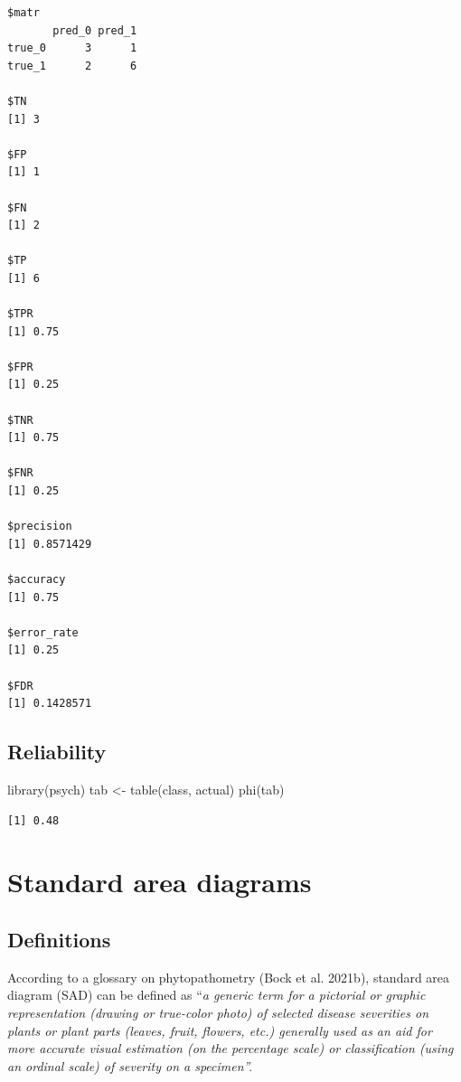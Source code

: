 \documentclass[
  letterpaper,
]{book}
\newenvironment{Shaded}{\begin{snugshade}}{\end{snugshade}}
\newcommand{\FunctionTok}[1]{\textcolor[rgb]{0.28,0.35,0.67}{#1}}
\newcommand{\NormalTok}[1]{\textcolor[rgb]{0.00,0.23,0.31}{#1}}
\newcommand{\OtherTok}[1]{\textcolor[rgb]{0.00,0.23,0.31}{#1}}
\begin{document}
\begin{verbatim}
$matr
       pred_0 pred_1
true_0      3      1
true_1      2      6

$TN
[1] 3

$FP
[1] 1

$FN
[1] 2

$TP
[1] 6

$TPR
[1] 0.75

$FPR
[1] 0.25

$TNR
[1] 0.75

$FNR
[1] 0.25

$precision
[1] 0.8571429

$accuracy
[1] 0.75

$error_rate
[1] 0.25

$FDR
[1] 0.1428571
\end{verbatim}

\hypertarget{reliability}{%
\section{Reliability}\label{reliability}}

\begin{Shaded}
\begin{Highlighting}[]
\FunctionTok{library}\NormalTok{(psych)}
\NormalTok{tab }\OtherTok{\textless{}{-}} \FunctionTok{table}\NormalTok{(class, actual)}
\FunctionTok{phi}\NormalTok{(tab)}
\end{Highlighting}
\end{Shaded}

\begin{verbatim}
[1] 0.48
\end{verbatim}

\hypertarget{standard-area-diagrams}{%
\chapter{Standard area diagrams}\label{standard-area-diagrams}}

\hypertarget{definitions}{%
\section{Definitions}\label{definitions}}

According to a glossary on phytopathometry (Bock et al. 2021b), standard
area diagram (SAD) can be defined as ``\emph{a generic term for a
pictorial or graphic representation (drawing or true-color photo) of
selected disease severities on plants or plant parts (leaves, fruit,
flowers, etc.) generally used as an aid for more accurate visual
estimation (on the percentage scale) or classification (using an ordinal
scale) of severity on a specimen''.}
\end{document}
